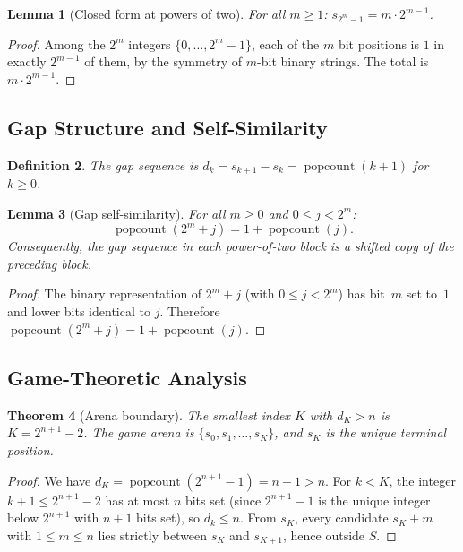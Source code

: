 \documentclass[11pt,a4paper]{article}
\newtheorem{theorem}{Theorem}
\newtheorem{lemma}[theorem]{Lemma}
\newtheorem{definition}[theorem]{Definition}
\begin{document}
\begin{lemma}[Closed form at powers of two]
\label{lem:pow2}
For all $m \ge 1$: $s_{2^m - 1} = m \cdot 2^{m-1}$.
\end{lemma}

\begin{proof}
Among the $2^m$ integers $\{0, \ldots, 2^m - 1\}$, each of the $m$ bit positions is $1$ in exactly $2^{m-1}$ of them, by the symmetry of $m$-bit binary strings. The total is $m \cdot 2^{m-1}$.
\end{proof}

\subsection{Gap Structure and Self-Similarity}

\begin{definition}
The \emph{gap sequence} is $d_k = s_{k+1} - s_k = \operatorname{popcount}(k+1)$ for $k \ge 0$.
\end{definition}

\begin{lemma}[Gap self-similarity]
\label{lem:selfsimilar}
For all $m \ge 0$ and $0 \le j < 2^m$:
\[
\operatorname{popcount}(2^m + j) = 1 + \operatorname{popcount}(j).
\]
Consequently, the gap sequence in each power-of-two block is a shifted copy of the preceding block.
\end{lemma}

\begin{proof}
The binary representation of $2^m + j$ (with $0 \le j < 2^m$) has bit~$m$ set to~$1$ and lower bits identical to $j$. Therefore $\operatorname{popcount}(2^m + j) = 1 + \operatorname{popcount}(j)$.
\end{proof}

\subsection{Game-Theoretic Analysis}

\begin{theorem}[Arena boundary]
\label{thm:arena}
The smallest index $K$ with $d_K > n$ is $K = 2^{n+1} - 2$. The game arena is $\{s_0, s_1, \ldots, s_K\}$, and $s_K$ is the unique terminal position.
\end{theorem}

\begin{proof}
We have $d_K = \operatorname{popcount}(2^{n+1} - 1) = n+1 > n$. For $k < K$, the integer $k+1 \le 2^{n+1} - 2$ has at most $n$ bits set (since $2^{n+1} - 1$ is the unique integer below $2^{n+1}$ with $n+1$ bits set), so $d_k \le n$. From $s_K$, every candidate $s_K + m$ with $1 \le m \le n$ lies strictly between $s_K$ and $s_{K+1}$, hence outside $S$.
\end{proof}
\end{document}
